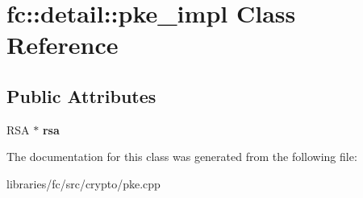 \hypertarget{classfc_1_1detail_1_1pke__impl}{}\section{fc\+:\+:detail\+:\+:pke\+\_\+impl Class Reference}
\label{classfc_1_1detail_1_1pke__impl}
\subsection*{Public Attributes}
\begin{DoxyCompactItemize}
\item 
\mbox{\label{classfc_1_1detail_1_1pke__impl_af0c38dba7382ed571cba684bbe1c8e3c}} 
R\+SA $\ast$ {\bfseries rsa}
\end{DoxyCompactItemize}


The documentation for this class was generated from the following file\+:\begin{DoxyCompactItemize}
\item 
libraries/fc/src/crypto/pke.\+cpp\end{DoxyCompactItemize}
